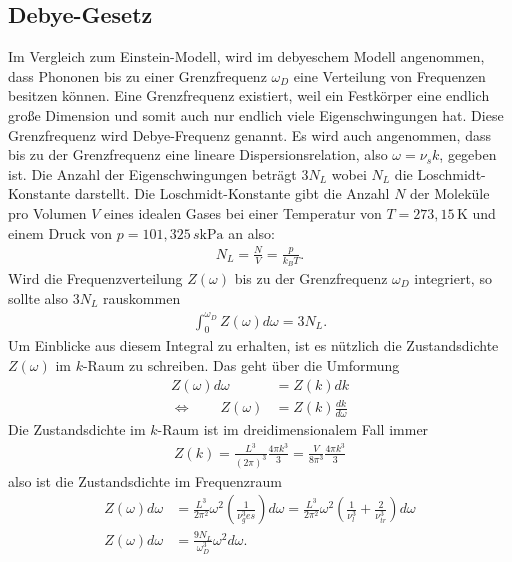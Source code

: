 \subsection{Debye-Gesetz}
\label{sec:debye}

Im Vergleich zum Einstein-Modell, wird im debyeschem Modell angenommen, dass Phononen bis zu einer Grenzfrequenz $\omega_D$ eine Verteilung von Frequenzen besitzen können. 
Eine Grenzfrequenz existiert, weil ein Festkörper eine endlich große Dimension und somit auch nur endlich viele Eigenschwingungen hat. Diese Grenzfrequenz wird Debye-Frequenz genannt. Es wird auch angenommen, 
dass bis zu der Grenzfrequenz eine lineare Dispersionsrelation, also $\omega = \nu_s k$, gegeben ist. 
Die Anzahl der Eigenschwingungen beträgt $3 N_L$ wobei $N_L$ die Loschmidt-Konstante darstellt. Die Loschmidt-Konstante gibt die Anzahl $N$ der Moleküle pro Volumen $V$ eines idealen Gases 
bei einer Temperatur von $T = 273,15\, \si{\kelvin}$ und einem Druck von $p = 101,325\,s \si{\kilo\pascal}$ an also:
\begin{align}
    N_L = \frac{N}{V} = \frac{p}{k_B T}.
\end{align}
Wird die Frequenzverteilung $Z(\omega)$ bis zu der Grenzfrequenz $\omega_D$ integriert, so sollte also $3 N_L$ rauskommen
\begin{align}
    \label{eqn:Z_integral}
    \int_0^{\omega_D} Z(\omega) d\omega = 3 N_L .
\end{align}
Um Einblicke aus diesem Integral zu erhalten, ist es nützlich die Zustandsdichte $Z(\omega)$ im $k$-Raum zu schreiben. Das geht über die Umformung 
\begin{align}
    Z(\omega) d\omega &= Z(k) d k\\
    \Leftrightarrow \, \, \, \, \, \, \, \, \, \, \, \, Z(\omega) &= Z(k) \frac{d k}{d\omega}
\end{align}
Die Zustandsdichte im $k$-Raum ist im dreidimensionalem Fall immer 
\begin{align}
    Z(k) = \frac{L^3}{\left(2 \pi\right)^3} \frac{4 \pi k^3}{3} = \frac{V}{8 \pi^3} \frac{4 \pi k^3}{3}
\end{align}
also ist die Zustandsdichte im Frequenzraum
\begin{align}
    \label{eqn:Z}
    Z(\omega) d \omega &= \frac{L^3}{2 \pi^2} \omega^2 \left(\frac{1}{\nu^3_ges} \right) d\omega= \frac{L^3}{2 \pi^2} \omega^2 \left(\frac{1}{\nu^3_l} + \frac{2}{\nu^3_{tr}}\right) d\omega \\
    Z(\omega) d \omega &= \frac{9 N_L}{\omega_D^3} \omega^2 d \omega.
\end{align}

